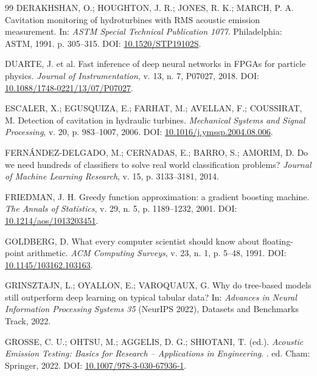\documentclass[12pt]{article}
\begin{document}
{\begin{thebibliography}{99}
	DERAKHSHAN, O.; HOUGHTON, J. R.; JONES, R. K.; MARCH, P. A.
	\newblock Cavitation monitoring of hydroturbines with RMS acoustic emission measurement.
	\newblock In: \emph{ASTM Special Technical Publication 1077}.
	\newblock Philadelphia: ASTM, 1991. p. 305--315.
	\newblock DOI: \href{https://doi.org/10.1520/STP19102S}{10.1520/STP19102S}.

	DUARTE, J. et al.
	\newblock Fast inference of deep neural networks in FPGAs for particle physics.
	\newblock \emph{Journal of Instrumentation}, v. 13, n. 7, P07027, 2018.
	\newblock DOI: \href{https://doi.org/10.1088/1748-0221/13/07/P07027}{10.1088/1748-0221/13/07/P07027}.

	ESCALER, X.; EGUSQUIZA, E.; FARHAT, M.; AVELLAN, F.; COUSSIRAT, M.
	\newblock Detection of cavitation in hydraulic turbines.
	\newblock \emph{Mechanical Systems and Signal Processing}, v. 20, p. 983--1007, 2006.
	\newblock DOI: \href{https://doi.org/10.1016/j.ymssp.2004.08.006}{10.1016/j.ymssp.2004.08.006}.

	FERNÁNDEZ-DELGADO, M.; CERNADAS, E.; BARRO, S.; AMORIM, D.
	\newblock Do we need hundreds of classifiers to solve real world classification problems?
	\newblock \emph{Journal of Machine Learning Research}, v. 15, p. 3133--3181, 2014.

	FRIEDMAN, J. H.
	\newblock Greedy function approximation: a gradient boosting machine.
	\newblock \emph{The Annals of Statistics}, v. 29, n. 5, p. 1189--1232, 2001.
	\newblock DOI: \href{https://doi.org/10.1214/aos/1013203451}{10.1214/aos/1013203451}.

	GOLDBERG, D.
	\newblock What every computer scientist should know about floating-point arithmetic.
	\newblock \emph{ACM Computing Surveys}, v. 23, n. 1, p. 5--48, 1991.
	\newblock DOI: \href{https://doi.org/10.1145/103162.103163}{10.1145/103162.103163}.

	GRINSZTAJN, L.; OYALLON, E.; VAROQUAUX, G.
	\newblock Why do tree-based models still outperform deep learning on typical tabular data?
	\newblock In: \emph{Advances in Neural Information Processing Systems 35} (NeurIPS 2022), Datasets and Benchmarks Track, 2022.

	GROSSE, C. U.; OHTSU, M.; AGGELIS, D. G.; SHIOTANI, T. (ed.).
	\newblock \emph{Acoustic Emission Testing: Basics for Research -- Applications in Engineering}.
	. ed. Cham: Springer, 2022.
	\newblock DOI: \href{https://doi.org/10.1007/978-3-030-67936-1}{10.1007/978-3-030-67936-1}.


\end{thebibliography}}
\end{document}
